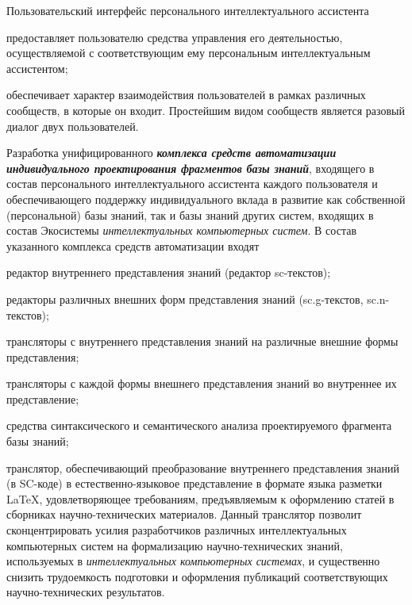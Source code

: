 \begin{textitemize}
	Пользовательский интерфейс персонального интеллектуального ассистента
	\begin{textitemize}
		\item предоставляет пользователю средства управления его  деятельностью, осуществляемой  с соответствующим ему персональным интеллектуальным ассистентом;
		\item обеспечивает  характер взаимодействия пользователей в рамках различных сообществ, в которые он входит. Простейшим видом сообществ является разовый диалог двух пользователей.
	\end{textitemize}
	\item
	Разработка унифицированного \textbf{\textit{комплекса средств автоматизации индивидуального проектирования фрагментов базы знаний}}, входящего в состав персонального интеллектуального ассистента каждого пользователя и обеспечивающего поддержку индивидуального вклада в развитие как собственной (персональной) базы знаний, так и базы знаний других систем, входящих в состав Экосистемы \textit{интеллектуальных компьютерных систем}. В состав указанного комплекса средств автоматизации входят
	\begin{textitemize}
		\item редактор внутреннего представления знаний (редактор sc-текстов);
		\item редакторы различных внешних форм представления знаний (sc.g-текстов, sc.n-текстов);
		\item трансляторы с внутреннего представления знаний на различные внешние формы представления;
		\item трансляторы с каждой формы внешнего представления знаний во внутреннее их представление;
		\item средства синтаксического и семантического анализа проектируемого фрагмента базы знаний;
		\item транслятор, обеспечивающий преобразование внутреннего представления знаний (в SC-коде) в естествен\-но-языковое представление в формате языка разметки LaTeX, удовлетворяющее требованиям, предъявляемым к оформлению статей в сборниках научно-технических материалов. Данный транслятор позволит сконцентрировать усилия разработчиков различных интеллектуальных компьютерных систем на формализацию научно-технических знаний, используемых в \textit{интеллектуальных компьютерных системах}, и существенно снизить трудоемкость подготовки и оформления публикаций соответствующих научно-технических результатов.\\

\end{textitemize}
\end{textitemize}
